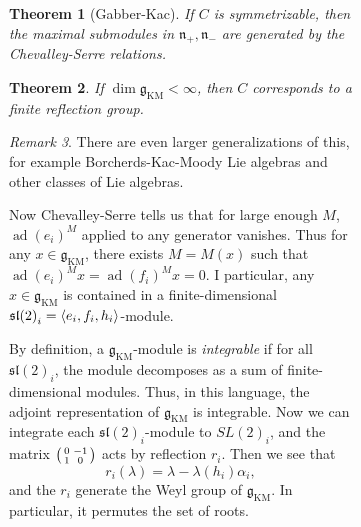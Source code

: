 \documentclass[leqno, openany]{memoir}
\newtheorem{thm}{Theorem}[section]
\theoremstyle{definition}
\theoremstyle{remark}
\newtheorem{rmk}[thm]{Remark}
\theoremstyle{plain}
\theoremstyle{definition}
\theoremstyle{remark}
\newcommand{\mf}[1]{\mathfrak{#1}}
\newcommand{\mr}[1]{\mathrm{#1}}
\DeclareMathOperator{\ad}{ad}
\begin{document}
\begin{figure}[H]
\begin{figure}[H]
\begin{thm}[Gabber-Kac] If $C$ is symmetrizable, then the maximal submodules in
$\mf{n}_+, \mf{n}_-$ are generated by the Chevalley-Serre relations.  \end{thm}

\begin{thm} If $\dim \mf{g}_{\mr{KM}} < \infty$, then $C$ corresponds to a
finite reflection group.  \end{thm}

\begin{rmk} There are even larger generalizations of this, for example
Borcherds-Kac-Moody Lie algebras and other classes of Lie algebras.  \end{rmk}

Now Chevalley-Serre tells us that for large enough $M$, ${\ad(e_i)}^M$ applied
to any generator vanishes. Thus for any $x \in \mf{g}_{\mr{KM}}$, there exists
$M = M(x)$ such that ${\ad(e_i)}^M x = {\ad(f_i)}^M x = 0$. I particular, any
$x \in \mf{g}_{\mr{KM}}$ is contained in a finite-dimensional ${\mf{sl}(2)}_i =
\ev{e_i, f_i, h_i}$-module.

By definition, a $\mf{g}_{\mr{KM}}$-module is \textit{integrable} if for all
${\mf{sl}(2)}_i$, the module decomposes as a sum of finite-dimensional modules.
Thus, in this language, the adjoint representation of $\mf{g}_{\mr{KM}}$ is
integrable. Now we can integrate each ${\mf{sl}(2)}_i$-module to ${SL(2)}_i$,
and the matrix $\begin{psmallmatrix} 0 & -1 \\ 1 & 0 \end{psmallmatrix}$ acts
by reflection $r_i$. Then we see that \[ r_i(\lambda) = \lambda - \lambda(h_i)
\alpha_i, \] and the $r_i$ generate the Weyl group of $\mf{g}_{\mr{KM}}$. In
particular, it permutes the set of roots.


\end{figure}
\end{figure}
\end{document}
